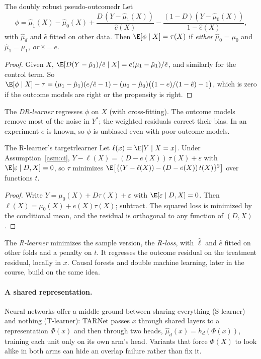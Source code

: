 \documentclass[11pt]{article}
\begin{document}
\begin{prop}{The doubly robust pseudo-outcome}{dr}
Let
\[
  \phi = \hat\mu_1(X) - \hat\mu_0(X) + \frac{D\,(Y - \hat\mu_1(X))}{\hat e(X)} - \frac{(1-D)(Y - \hat\mu_0(X))}{1 - \hat e(X)},
\]
with $\hat\mu_d$ and $\hat e$ fitted on other data. Then $\E[\phi \mid X] = \tau(X)$ if \emph{either} $\hat\mu_0 = \mu_0$
and $\hat\mu_1 = \mu_1$, \emph{or} $\hat e = e$.
\end{prop}
\begin{proof}
Given $X$, $\E[D(Y - \hat\mu_1)/\hat e \mid X] = e(\mu_1 - \hat\mu_1)/\hat e$, and similarly for the control term.
So $\E[\phi \mid X] - \tau = (\mu_1 - \hat\mu_1)(e/\hat e - 1) - (\mu_0 - \hat\mu_0)\big((1-e)/(1-\hat e) - 1\big)$,
which is zero if the outcome models are right or the propensity is right.
\end{proof}
The \emph{DR-learner} regresses $\phi$ on $X$ (with cross-fitting). The outcome models remove most of the noise in
$Y^\ast$; the weighted residuals correct their bias. In an experiment $e$ is known, so $\phi$ is unbiased even with
poor outcome models.

\begin{prop}{The R-learner's target}{rlearner}
Let $\ell(x) = \E[Y \mid X=x]$. Under Assumption~\ref{asm:ci}, $Y - \ell(X) = (D - e(X))\,\tau(X) + \varepsilon$ with
$\E[\varepsilon \mid D, X] = 0$, so $\tau$ minimizes $\E\big[\{(Y - \ell(X)) - (D - e(X))\,t(X)\}^2\big]$ over functions $t$.
\end{prop}
\begin{proof}
Write $Y = \mu_0(X) + D\tau(X) + \varepsilon$ with $\E[\varepsilon \mid D, X] = 0$. Then
$\ell(X) = \mu_0(X) + e(X)\tau(X)$; subtract. The squared loss is minimized by the conditional mean, and
the residual is orthogonal to any function of $(D, X)$.
\end{proof}
The \emph{R-learner} minimizes the sample version, the \emph{R-loss}, with $\hat\ell$ and $\hat e$ fitted on other
folds and a penalty on $t$. It regresses the outcome residual on the treatment residual, locally in $x$. Causal forests and double
machine learning, later in the course, build on the same idea.

\paragraph{A shared representation.} Neural networks offer a middle ground between sharing everything
(S-learner) and nothing (T-learner): TARNet passes $x$ through shared layers to a representation $\Phi(x)$ and
then through two heads, $\hat\mu_d(x) = h_d(\Phi(x))$, training each unit only on its own arm's head. Variants
that force $\Phi(X)$ to look alike in both arms can hide an overlap failure rather than fix it.
\end{document}
